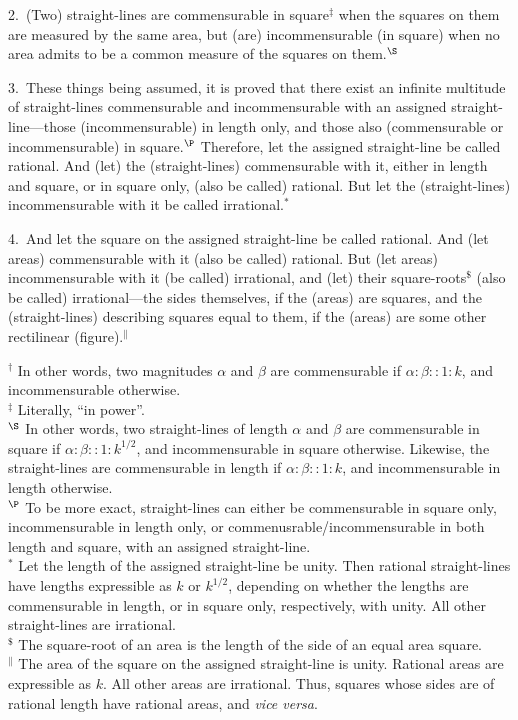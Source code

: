 \begin{Parallel}{}{}
{2.~(Two) straight-lines are commensurable in square$^\ddag$ when the squares on
them are measured by the same area, but (are) incommensurable (in square)
when no area admits to be a common measure of the squares on them.$^\S$

3.~These things being assumed, it is proved that there
exist an infinite multitude of straight-lines commensurable and
incommensurable with an assigned straight-line---those  (incommensurable) in length only, and
those also (commensurable or incommensurable) in square.$^\P$ 
Therefore, let
the assigned straight-line be called rational. And (let) the (straight-lines) commensurable
with it, either in length and square, or in square only, (also be called) rational. But let the (straight-lines) incommensurable with it be called
irrational.$^\ast$ 

4.~And let the square on the assigned straight-line be called  rational. And (let areas) commensurable with it (also be called) rational. But  (let areas) incommensurable with it (be called) irrational, and (let) their square-roots$^\$$ (also be called) irrational---the sides themselves, if the (areas)
are squares, and the (straight-lines) describing squares equal to them, if the (areas) are some other rectilinear (figure).$^\|$}
\end{Parallel}

{\footnotesize\noindent $^\dag$ In other words, two magnitudes $\alpha$ and
$\beta$ are commensurable if $\alpha:\beta::1:k$, and incommensurable otherwise.\\[0.5ex]
$^\ddag$ Literally, ``in power''.\\[0.5ex]
$^\S$  In other words, two straight-lines of length $\alpha$ and $\beta$ are commensurable in square if $\alpha : \beta::1:k^{1/2}$,  and incommensurable in square otherwise. Likewise, the straight-lines
are commensurable in length if $\alpha:\beta::1:k$, and incommensurable in length otherwise.\\[0.5ex]
$^\P$ To be more exact, straight-lines can either be commensurable in square only, incommensurable in length only, or commenusrable/incommensurable in both
length and square, with an assigned straight-line.\\[0.5ex]
$^\ast$ Let the length of the assigned straight-line be unity. Then rational
straight-lines have lengths expressible as $k$ or $k^{1/2}$, depending on whether the lengths are commensurable in length, or in square only, respectively,
with unity.  All other straight-lines are irrational.\\[0.5ex]
$^\$$ The square-root of an area is the length of the side of an equal area square.\\[0.5ex]
$^\|$ The area of the  square 
on the assigned straight-line is unity. Rational areas are expressible as $k$.  All other areas are irrational. Thus, squares whose
sides are of rational length have  rational areas, and {\em vice versa}.}

